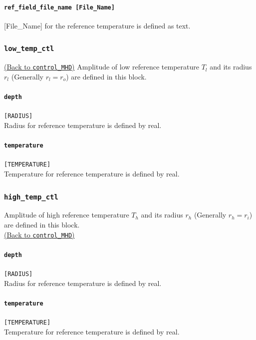 \paragraph{\tt ref\_field\_file\_name [File\_Name]}
\label{href_t:ref_field_file_name}
 [File\_Name] for the reference temperature is defined as text. 

\subsubsection{\tt low\_temp\_ctl}
\hyperref[href_i:low_temp_ctl]{(Back to {\tt control\_MHD})}
Amplitude of low reference temperature $T_{l}$ and its radius $r_{l}$ (Generally $r_{l} = r_{o}$) are defined in this block. \\
\label{href_t:low_temp_ctl}

\paragraph{\tt depth}
\label{href_t:l_depth}
\verb|[RADIUS]| \\
Radius for reference temperature is defined by real.

\paragraph{\tt temperature}
\label{href_t:l_temperature}
\verb|[TEMPERATURE]| \\
Temperature for reference temperature is defined by real.

\subsubsection{\tt high\_temp\_ctl}
\label{href_t:high_temp_ctl}
Amplitude of high reference temperature $T_{h}$ and its radius $r_{h}$ (Generally $r_{h} = r_{i}$) are defined in this block. \\
\hyperref[href_i:high_temp_ctl]{(Back to {\tt control\_MHD})}

\paragraph{\tt depth}
\label{href_t:h_depth}
\verb|[RADIUS]| \\
Radius for reference temperature is defined by real.

\paragraph{\tt temperature}
\label{href_t:h_temperature}
\verb|[TEMPERATURE]| \\
Temperature for reference temperature is defined by real.

